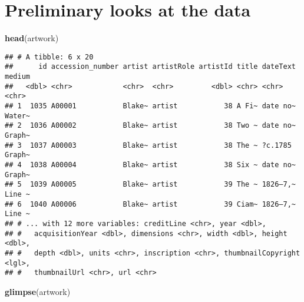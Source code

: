 \documentclass[]{article}
\newenvironment{Shaded}{\begin{snugshade}}{\end{snugshade}}
\newcommand{\KeywordTok}[1]{\textcolor[rgb]{0.13,0.29,0.53}{\textbf{#1}}}
\newcommand{\NormalTok}[1]{#1}
\begin{document}
\hypertarget{preliminary-looks-at-the-data}{%
\section{Preliminary looks at the
data}\label{preliminary-looks-at-the-data}}

\begin{Shaded}
\begin{Highlighting}[]
\KeywordTok{head}\NormalTok{(artwork)}
\end{Highlighting}
\end{Shaded}

\begin{verbatim}
## # A tibble: 6 x 20
##      id accession_number artist artistRole artistId title dateText medium
##   <dbl> <chr>            <chr>  <chr>         <dbl> <chr> <chr>    <chr> 
## 1  1035 A00001           Blake~ artist           38 A Fi~ date no~ Water~
## 2  1036 A00002           Blake~ artist           38 Two ~ date no~ Graph~
## 3  1037 A00003           Blake~ artist           38 The ~ ?c.1785  Graph~
## 4  1038 A00004           Blake~ artist           38 Six ~ date no~ Graph~
## 5  1039 A00005           Blake~ artist           39 The ~ 1826–7,~ Line ~
## 6  1040 A00006           Blake~ artist           39 Ciam~ 1826–7,~ Line ~
## # ... with 12 more variables: creditLine <chr>, year <dbl>,
## #   acquisitionYear <dbl>, dimensions <chr>, width <dbl>, height <dbl>,
## #   depth <dbl>, units <chr>, inscription <chr>, thumbnailCopyright <lgl>,
## #   thumbnailUrl <chr>, url <chr>
\end{verbatim}

\begin{Shaded}
\begin{Highlighting}[]
\KeywordTok{glimpse}\NormalTok{(artwork)}
\end{Highlighting}
\end{Shaded}
\end{document}
